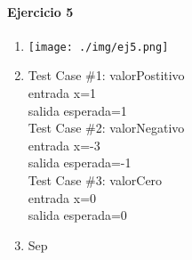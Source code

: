 \documentclass{article}
\begin{document}
\paragraph{Ejercicio 5}

\begin{multicols}{2}
\begin{enumerate}
\item \texttt{[image: ./img/ej5.png]}
\item 
Test Case \#1: valorPostitivo\\
\hspace*{6mm}entrada x=1\\
\hspace*{6mm}salida esperada=1\medskip\\
Test Case \#2: valorNegativo\\
\hspace*{6mm}entrada x=-3\\
\hspace*{6mm}salida esperada=-1\medskip\\
Test Case \#3: valorCero\\
\hspace*{6mm}entrada x=0\\
\hspace*{6mm}salida esperada=0\medskip\\
\item	Sep
\end{enumerate}
\end{multicols}
\end{document}
